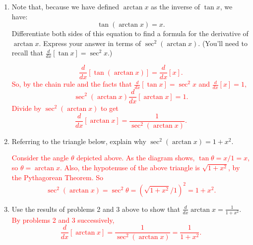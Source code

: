 \documentclass[letterpaper,10pt]{article}
\def\ds{\displaystyle}
\newcommand{\opsol}{1}
\newcommand{\sol}[1]{\textcolor{red}{#1}}
\newcommand{\opsol}{0}
\newcommand{\sol}[1]{\textcolor{white}{#1}}
\begin{document}
\begin{enumerate}
\begin{enumerate}
\begin{center}
\end{center}
\end{enumerate}

\newpage

\item  Note that, because we have defined $\arctan x$ as the inverse of $\tan x$, we have: \[\tan(\arctan x)=x.\] Differentiate both sides of this equation to find a formula for the derivative of $\arctan x$. Express your answer in terms of $\sec^2(\arctan x)$. (You'll need to recall that $\displaystyle\frac{d}{dx}[\tan x]=\sec^2 x$.)

\sol{\[  \frac{d}{dx}[\tan(\arctan x)]=\frac{d}{dx}[x].\] So, by the chain rule and the facts that $\displaystyle\frac{d}{dx}[\tan x]=\sec^2 x$ and $\displaystyle\frac{d}{dx}[x]=1,$\[\sec^2(\arctan x)
\frac{d}{dx}[ \arctan x]=1.\]  Divide by $\sec^2(\arctan x)
$ to get
\[
\frac{d}{dx}[ \arctan x]=\frac{1}{\sec^2(\arctan x)}.\]}
 
\item Referring to the triangle below, explain why $\sec^2(\arctan x)=1+x^2$. 
\begin{center}
\end{center}
\sol{Consider the angle $\theta$ depicted above.  As the diagram shows, $\tan\theta=x/1=x$, so $\theta=\arctan x$.  Also, the hypotenuse of the above triangle is $\sqrt{1+x^2}$, by the Pythagorean Theorem.  So $$\sec^2(\arctan x)=\sec^2\theta=\left(\sqrt{1+x^2}/1\right)^2=1+x^2.$$}
\vfill
\item Use the results of problems 2 and 3 above to show that $\ds \frac{d}{dx}  \arctan x =\frac{1}{1+x^2}.$
\sol{By problems 2 and 3 successively,
\[\frac{d}{dx}[ \arctan x]=\frac{1}{\sec^2(\arctan x)}=\frac{1}{1+x^2}.\]}
\vfill
\end{enumerate}
  
 
  
\end{document}

